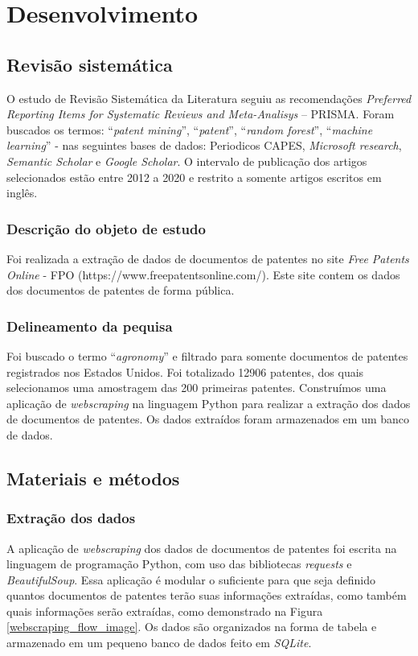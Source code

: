 

\chapter{Desenvolvimento}\label{cap_exemplos}

\section{Revisão sistemática}
O estudo de Revisão Sistemática da Literatura seguiu as recomendações \textit{Preferred Reporting Items for Systematic Reviews and Meta-Analisys} – PRISMA.
Foram buscados os termos: “\textit{patent mining}”, “\textit{patent}”, “\textit{random forest}”, “\textit{machine learning}” - nas seguintes bases de dados: Periodicos CAPES, \textit{Microsoft research}, \textit{Semantic Scholar} e \textit{Google Scholar}. O intervalo de publicação dos artigos selecionados estão entre 2012 a 2020 e restrito a somente artigos escritos em inglês.

\subsection{Descrição do objeto de estudo}
Foi realizada a extração de dados de documentos de patentes no site \textit{Free Patents Online} - FPO (https://www.freepatentsonline.com/). Este site contem os dados dos documentos de patentes de forma pública.

\subsection{Delineamento da pequisa}
Foi buscado o termo “\textit{agronomy}” e filtrado para somente documentos de patentes registrados nos Estados Unidos. Foi totalizado 12906 patentes, dos quais selecionamos uma amostragem das 200 primeiras patentes. Construímos uma aplicação de \textit{webscraping} na linguagem Python para realizar a extração dos dados de documentos de patentes.  Os dados extraídos foram armazenados em um banco de dados.

\section{Materiais e métodos}

\subsection{Extração dos dados}
A aplicação de \textit{webscraping} dos dados de documentos de patentes foi escrita na linguagem de programação Python, com uso das bibliotecas \textit{requests} e \textit{BeautifulSoup}. Essa aplicação é modular o suficiente para que seja definido quantos documentos de patentes terão suas informações extraídas, como também quais informações serão extraídas, como demonstrado na Figura \ref{webscraping_flow_image}. Os dados são organizados na forma de tabela e armazenado em um pequeno banco de dados feito em \textit{SQLite}.

